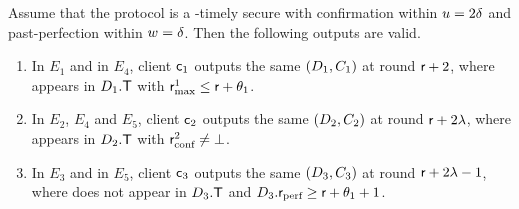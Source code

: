 \begin{lemma}\label{lem:lower-bound-readers}
    Assume that the protocol is a \parTemp-timely secure \podtm with
    confirmation within $u = 2\delta$ and past-perfection within
    $w = \delta$. Then the following outputs are valid.
    \begin{enumerate}
        \item In $E_1$ and in $E_4$, client $\textsf{c}_1$ outputs the same
            $(D_1, C_1)$ at round $\textsf{r} + 2$, where \tx appears in
            $D_1.\textsf{T}$ with $\textsf{r}_\text{max}^1 \leq \textsf{r} + \theta_1$.
        \item In $E_2$, $E_4$ and $E_5$, client $\textsf{c}_2$ outputs the same
            $(D_2, C_2)$ at round $\textsf{r} + 2\lambda$, where \tx appears in
            $D_2.\textsf{T}$ with $\textsf{r}_\text{conf}^2 \neq \bot$.
        \item In $E_3$ and in $E_5$, client $\textsf{c}_3$ outputs the same
            $(D_3, C_3)$ at round $\textsf{r} + 2\lambda - 1$, where \tx does
            not appear in $D_3.\textsf{T}$ and $D_3.\textsf{r}_\text{perf} \geq \textsf{r} +
            \theta_1 + 1$.
    \end{enumerate}
\end{lemma}
